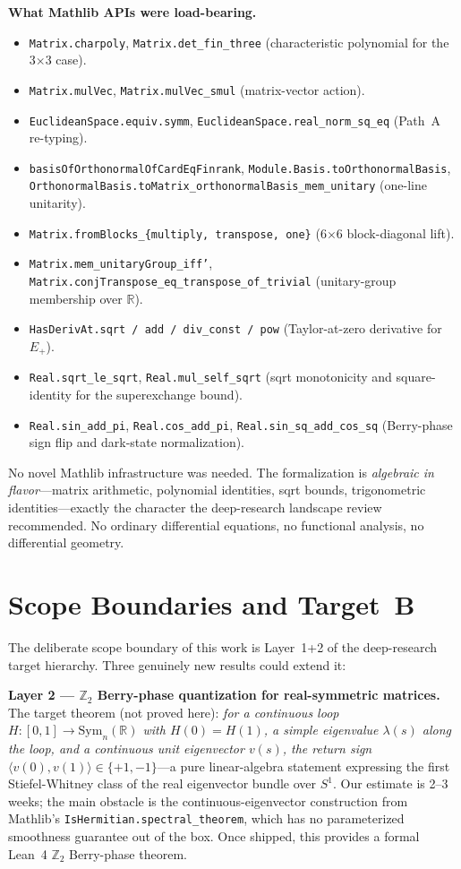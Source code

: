 \documentclass[aps,prd,twocolumn,showpacs,superscriptaddress,nofootinbib]{revtex4-2}
\begin{document}
\textbf{What Mathlib APIs were load-bearing.}
\begin{itemize}
\item \texttt{Matrix.charpoly}, \texttt{Matrix.det\_fin\_three}
(characteristic polynomial for the 3$\times$3 case).
\item \texttt{Matrix.mulVec}, \texttt{Matrix.mulVec\_smul}
(matrix-vector action).
\item \texttt{EuclideanSpace.equiv.symm},
\texttt{EuclideanSpace.real\_norm\_sq\_eq} (Path~A re-typing).
\item \texttt{basisOfOrthonormalOfCardEqFinrank},
\texttt{Module.Basis.toOrthonormalBasis},
\texttt{OrthonormalBasis.toMatrix\_orthonormalBasis\_mem\_unitary}
(one-line unitarity).
\item \texttt{Matrix.fromBlocks\_\{multiply, transpose, one\}}
(6$\times$6 block-diagonal lift).
\item \texttt{Matrix.mem\_unitaryGroup\_iff'},
\texttt{Matrix.conjTranspose\_eq\_transpose\_of\_trivial} (unitary-group
membership over $\mathbb{R}$).
\item \texttt{HasDerivAt.sqrt / add / div\_const / pow} (Taylor-at-zero
derivative for $E_+$).
\item \texttt{Real.sqrt\_le\_sqrt}, \texttt{Real.mul\_self\_sqrt}
(sqrt monotonicity and square-identity for the superexchange bound).
\item \texttt{Real.sin\_add\_pi}, \texttt{Real.cos\_add\_pi},
\texttt{Real.sin\_sq\_add\_cos\_sq} (Berry-phase sign flip and dark-state
normalization).
\end{itemize}

No novel Mathlib infrastructure was needed. The formalization is
\emph{algebraic in flavor}---matrix arithmetic, polynomial identities,
sqrt bounds, trigonometric identities---exactly the character the
deep-research landscape review recommended. No ordinary differential
equations, no functional analysis, no differential geometry.

\section{Scope Boundaries and Target~B}
\label{sec:future}

The deliberate scope boundary of this work is Layer~1+2 of the deep-research
target hierarchy. Three genuinely new results could extend it:

\textbf{Layer 2 — $\mathbb{Z}_2$ Berry-phase quantization for
real-symmetric matrices.} The target theorem (not proved here):
\textit{for a continuous loop $H: [0,1] \to \mathrm{Sym}_n(\mathbb{R})$
with $H(0) = H(1)$, a simple eigenvalue $\lambda(s)$ along the loop,
and a continuous unit eigenvector $v(s)$, the return sign
$\langle v(0), v(1)\rangle \in \{+1, -1\}$}---a pure linear-algebra
statement expressing the first Stiefel-Whitney class of the real
eigenvector bundle over $S^1$. Our estimate is 2--3 weeks; the main
obstacle is the continuous-eigenvector construction from Mathlib's
\texttt{IsHermitian.spectral\_theorem}, which has no parameterized
smoothness guarantee out of the box. Once shipped, this provides a
formal Lean~4 $\mathbb{Z}_2$ Berry-phase theorem.
\end{document}
